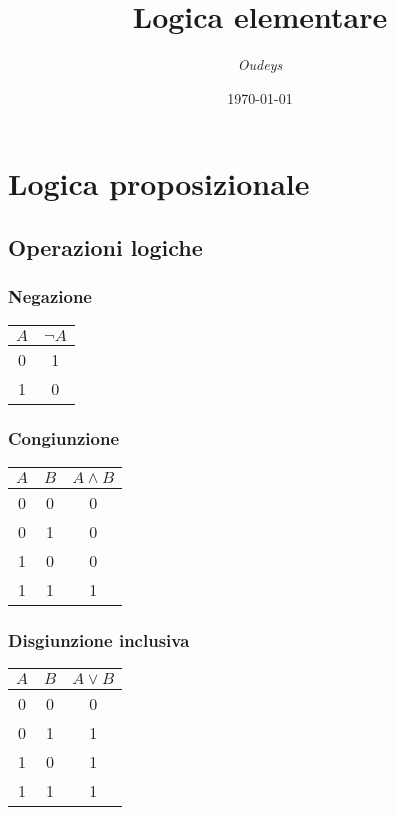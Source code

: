 \documentclass[a4paper,12pt]{article}
\title{\textbf{Logica elementare}}
\author{\textit{Oudeys}}
\date{\today}
\theoremstyle{mystyle}
\begin{document}
\maketitle


\tableofcontents
\newpage

\section{Logica proposizionale}
\subsection{Operazioni logiche}

\subsubsection{Negazione}
\begin{table}[h]
    \centering
    \begin{tabular}{|c|c|}
        \hline
        \textbf{\(A\)} & \textbf{\(\neg A\)} \\
        \hline
        0 & 1 \\
        \hline
        1 & 0 \\
        \hline
    \end{tabular}
\end{table}

\subsubsection{Congiunzione}
\begin{table}[h]
    \centering
    \begin{tabular}{|c|c|c|}
        \hline
        \textbf{\(A\)} & \textbf{\(B\)} & \textbf{\(A \land B\)} \\
        \hline
        0 & 0 & 0 \\
        \hline
        0 & 1 & 0 \\
        \hline
        1 & 0 & 0 \\
        \hline
        1 & 1 & 1 \\
        \hline
    \end{tabular}
\end{table}

\subsubsection{Disgiunzione inclusiva}
\begin{table}[h]
    \centering
    \begin{tabular}{|c|c|c|}
        \hline
        \textbf{\(A\)} & \textbf{\(B\)} & \textbf{\(A \lor B\)} \\
        \hline
        0 & 0 & 0 \\
        \hline
        0 & 1 & 1 \\
        \hline
        1 & 0 & 1 \\
        \hline
        1 & 1 & 1 \\
        \hline
    \end{tabular}
\end{table}
\end{document}
